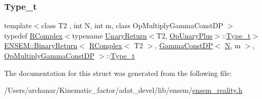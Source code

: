 \subsubsection{\texorpdfstring{Type\_t}{Type\_t}\hspace{0.1cm}{\footnotesize\ttfamily [2/2]}}
{\footnotesize\ttfamily template$<$class T2 , int N, int m, class Op\+Multiply\+Gamma\+Const\+DP $>$ \\
typedef \mbox{\hyperlink{classENSEM_1_1RComplex}{R\+Complex}}$<$typename \mbox{\hyperlink{structENSEM_1_1UnaryReturn}{Unary\+Return}}$<$T2, \mbox{\hyperlink{structENSEM_1_1OpUnaryPlus}{Op\+Unary\+Plus}}$>$\+::\mbox{\hyperlink{structENSEM_1_1BinaryReturn_3_01RComplex_3_01T2_01_4_00_01GammaConstDP_3_01N_00_01m_01_4_00_01OpMultiplyGammaConstDP_01_4_aea7c67b0aab65299ac861f01f5ec8737}{Type\+\_\+t}}$>$ \mbox{\hyperlink{structENSEM_1_1BinaryReturn}{E\+N\+S\+E\+M\+::\+Binary\+Return}}$<$ \mbox{\hyperlink{classENSEM_1_1RComplex}{R\+Complex}}$<$ T2 $>$, \mbox{\hyperlink{classENSEM_1_1GammaConstDP}{Gamma\+Const\+DP}}$<$ \mbox{\hyperlink{operator__name__util_8cc_a7722c8ecbb62d99aee7ce68b1752f337}{N}}, m $>$, \mbox{\hyperlink{structENSEM_1_1OpMultiplyGammaConstDP}{Op\+Multiply\+Gamma\+Const\+DP}} $>$\+::\mbox{\hyperlink{structENSEM_1_1BinaryReturn_3_01RComplex_3_01T2_01_4_00_01GammaConstDP_3_01N_00_01m_01_4_00_01OpMultiplyGammaConstDP_01_4_aea7c67b0aab65299ac861f01f5ec8737}{Type\+\_\+t}}}



The documentation for this struct was generated from the following file\+:\begin{DoxyCompactItemize}
\item 
/\+Users/archanar/\+Kinematic\+\_\+factor/adat\+\_\+devel/lib/ensem/\mbox{\hyperlink{lib_2ensem_2ensem__reality_8h}{ensem\+\_\+reality.\+h}}\end{DoxyCompactItemize}
